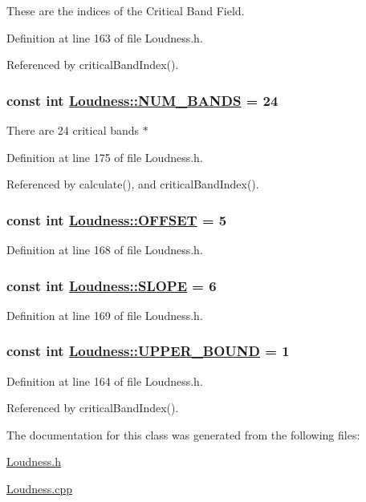 These are the indices of the Critical Band Field. 

Definition at line 163 of file Loudness.h.

Referenced by critical\-Band\-Index().\hypertarget{classLoudness_v8}{
\subsubsection[NUM\_\-BANDS]{\setlength{\rightskip}{0pt plus 5cm}const int \hyperlink{classLoudness_v8}{Loudness::NUM\_\-BANDS} = 24}}
\label{classLoudness_v8}


There are 24 critical bands $\ast$ 

Definition at line 175 of file Loudness.h.

Referenced by calculate(), and critical\-Band\-Index().\hypertarget{classLoudness_v5}{
\subsubsection[OFFSET]{\setlength{\rightskip}{0pt plus 5cm}const int \hyperlink{classLoudness_v5}{Loudness::OFFSET} = 5}}
\label{classLoudness_v5}




Definition at line 168 of file Loudness.h.\hypertarget{classLoudness_v6}{
\subsubsection[SLOPE]{\setlength{\rightskip}{0pt plus 5cm}const int \hyperlink{classLoudness_v6}{Loudness::SLOPE} = 6}}
\label{classLoudness_v6}




Definition at line 169 of file Loudness.h.\hypertarget{classLoudness_v1}{
\subsubsection[UPPER\_\-BOUND]{\setlength{\rightskip}{0pt plus 5cm}const int \hyperlink{classLoudness_v1}{Loudness::UPPER\_\-BOUND} = 1}}
\label{classLoudness_v1}




Definition at line 164 of file Loudness.h.

Referenced by critical\-Band\-Index().

The documentation for this class was generated from the following files:\begin{CompactItemize}
\item 
\hyperlink{Loudness_8h}{Loudness.h}\item 
\hyperlink{Loudness_8cpp}{Loudness.cpp}\end{CompactItemize}
